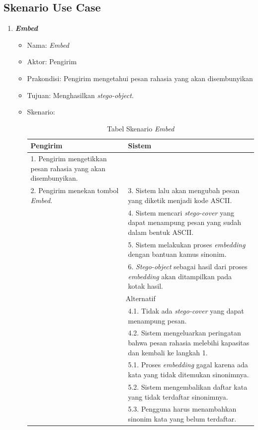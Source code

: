 \subsection{Skenario Use Case}

\begin{enumerate}
	\item \textbf{\textit{Embed}}
	\begin{itemize}
		\item Nama: \textit{Embed}
		\item Aktor: Pengirim
		\item Prakondisi: Pengirim mengetahui pesan rahasia yang akan disembunyikan
		\item Tujuan: Menghasilkan \textit{stego-object}.
		\item Skenario:
		\begin{table}[H]
		\centering
		\caption{Tabel Skenario \textit{Embed}}
		\begin{tabular}{| p{6.5cm} | p{6.5cm} |}\hline
		Pengirim & Sistem \\
		\hline
				1. Pengirim mengetikkan pesan rahasia yang akan disembunyikan. & \\
				\hline
				2. Pengirim menekan tombol \textit{Embed}. & 3. Sistem lalu akan mengubah pesan yang diketik menjadi kode ASCII. \\
				\hline
				& 4. Sistem mencari \textit{stego-cover} yang dapat menampung pesan yang sudah dalam bentuk ASCII. \\
				\hline
				& 5. Sistem melakukan proses \textit{embedding} dengan bantuan kamus sinonim. \\
				\hline
				& 6. \textit{Stego-object} sebagai hasil dari proses \textit{embedding} akan ditampilkan pada kotak hasil.\\
				\hline
				\hline
				\multicolumn{2}{|c|}{Alternatif}\\
				\hline
				&	4.1. Tidak ada \textit{stego-cover} yang dapat menampung pesan.\\
				\hline
				&	4.2. Sistem mengeluarkan peringatan bahwa pesan rahasia melebihi kapasitas dan kembali ke langkah 1.\\
				\hline
				&	5.1. Proses \textit{embedding} gagal karena ada kata yang tidak ditemukan sinonimnya.\\
				\hline
				&	5.2. Sistem mengembalikan daftar kata yang tidak terdaftar sinonimnya.\\
				\hline
				&	5.3. Pengguna harus menambahkan sinonim kata yang belum terdaftar.\\
				

\end{tabular}
\end{table}
\end{itemize}
\end{enumerate}
